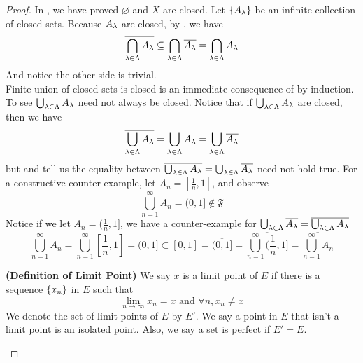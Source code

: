 \documentclass{report}
\begin{document}
\begin{proof}
In , we have proved $\varnothing$ and $X$ are closed. Let $\{ A_\lambda \}$ be an infinite collection of closed sets. Because $A_\lambda $ are closed, by , we have
\begin{equation}
\overline{\bigcap_{\lambda  \in \Lambda }A_\lambda }\subseteq \bigcap _{\lambda \in\Lambda }\overline{A_\lambda }=\bigcap _{\lambda \in\Lambda }A_\lambda 
\end{equation}
And notice the other side is trivial.\\

Finite union of closed sets is closed is an immediate consequence of  by induction. To see $\bigcup_{\lambda \in \Lambda }A_\lambda $ need not always be closed. Notice that if $\bigcup _{\lambda \in\Lambda }A_\lambda$ are closed, then we have
 \begin{equation}
   \overline{\bigcup_{\lambda \in \Lambda }A_\lambda}=\bigcup_{\lambda \in\Lambda }A_\lambda=\bigcup_{\lambda \in\Lambda }\overline{A_\lambda }
\end{equation}
but  and  tell us the equality between $\overline{\bigcup_{\lambda \in\Lambda }A_\lambda }=\bigcup_{\lambda \in \Lambda }\overline{A_\lambda }$ need not hold true. For a constructive counter-example, let $A_n=[\frac{1}{n},1]$, and observe
\begin{equation}
  \bigcup_{n=1}^\infty A_n=(0,1]\not\in \mathfrak{F}
\end{equation}
Notice if we let $A_n=(\frac{1}{n},1]$, we have a counter-example for $\bigcup_{\lambda \in \Lambda }\overline{A_\lambda }=\overline{\bigcup _{\lambda \in\Lambda }A_\lambda }$
\begin{equation}
  \bigcup_{n=1}^\infty A_n=\bigcup_{n=1}^\infty [\frac{1}{n},1]=(0,1]\subset [0,1]=\overline{(0,1]}=\overline{\bigcup_{n=1}^\infty(\frac{1}{n},1]}=\overline{\bigcup _{n=1}^\infty A_n}
\end{equation}
\begin{definition}
\label{3.2.6}
\textbf{(Definition of Limit Point)} We say $x$ is a limit point of  $E$ if there is a sequence $\{ x_n \}$ in $E$ such that
\begin{equation}
\lim_{n\to\infty} x_n=x\text{ and }\forall n, x_n\neq x
\end{equation}
We denote the set of limit points of $E$ by  $E'$. We say a point in $E$ that isn't a limit point is an isolated point. Also, we say a set is perfect if $E'=E$. 

\end{definition}
\end{proof}
\end{document}
